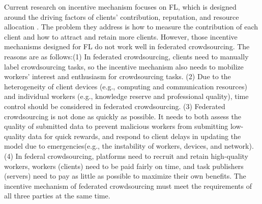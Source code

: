 \documentclass[final,1p,times]{elsarticle}
\begin{document}
Current research on incentive mechanism focuses on FL, which is designed around the driving factors of clients’ contribution, reputation, and resource allocation \citep{zhan2020learning,zhan2021survey,li2023incentive}. The problem they address is how to measure the contribution of each client and how to attract and retain more clients. However, those incentive mechanisms designed for FL do not work well in federated crowdsourcing. The reasons are as follows:(1) In federated crowdsourcing, clients need to manually label crowdsourcing tasks, so the incentive mechanism also needs to mobilize workers' interest and enthusiasm for crowdsourcing tasks. (2) Due to the heterogeneity of client devices (e.g., computing and communication resources) and individual workers (e.g., knowledge reserve and professional quality), time control should be considered in federated crowdsourcing. (3) Federated crowdsourcing is not done as quickly as possible. It needs to both assess the quality of submitted data to prevent malicious workers from submitting low-quality data for quick rewards, and respond to client delays in updating the model due to emergencies(e.g., the instability of workers, devices, and network). (4) In federal crowdsourcing, platforms need to recruit and retain high-quality workers, workers (clients) need to be paid fairly on time, and task publishers (servers) need to pay as little as possible to maximize their own benefits. The incentive mechanism of federated crowdsourcing must meet the requirements of all three parties at the same time.
\end{document}
